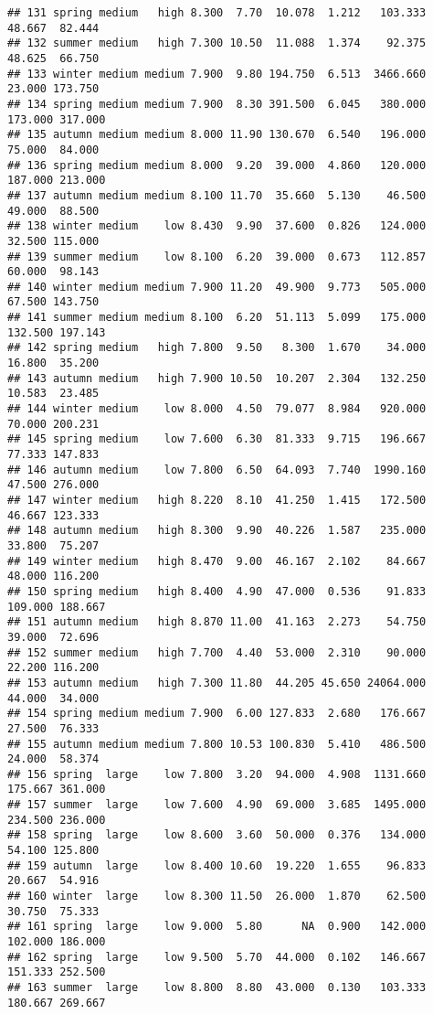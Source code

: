 \documentclass[
]{article}
\begin{document}
\begin{verbatim}
## 131 spring medium   high 8.300  7.70  10.078  1.212   103.333  48.667  82.444
## 132 summer medium   high 7.300 10.50  11.088  1.374    92.375  48.625  66.750
## 133 winter medium medium 7.900  9.80 194.750  6.513  3466.660  23.000 173.750
## 134 spring medium medium 7.900  8.30 391.500  6.045   380.000 173.000 317.000
## 135 autumn medium medium 8.000 11.90 130.670  6.540   196.000  75.000  84.000
## 136 spring medium medium 8.000  9.20  39.000  4.860   120.000 187.000 213.000
## 137 autumn medium medium 8.100 11.70  35.660  5.130    46.500  49.000  88.500
## 138 winter medium    low 8.430  9.90  37.600  0.826   124.000  32.500 115.000
## 139 summer medium    low 8.100  6.20  39.000  0.673   112.857  60.000  98.143
## 140 winter medium medium 7.900 11.20  49.900  9.773   505.000  67.500 143.750
## 141 summer medium medium 8.100  6.20  51.113  5.099   175.000 132.500 197.143
## 142 spring medium   high 7.800  9.50   8.300  1.670    34.000  16.800  35.200
## 143 autumn medium   high 7.900 10.50  10.207  2.304   132.250  10.583  23.485
## 144 winter medium    low 8.000  4.50  79.077  8.984   920.000  70.000 200.231
## 145 spring medium    low 7.600  6.30  81.333  9.715   196.667  77.333 147.833
## 146 autumn medium    low 7.800  6.50  64.093  7.740  1990.160  47.500 276.000
## 147 winter medium   high 8.220  8.10  41.250  1.415   172.500  46.667 123.333
## 148 autumn medium   high 8.300  9.90  40.226  1.587   235.000  33.800  75.207
## 149 winter medium   high 8.470  9.00  46.167  2.102    84.667  48.000 116.200
## 150 spring medium   high 8.400  4.90  47.000  0.536    91.833 109.000 188.667
## 151 autumn medium   high 8.870 11.00  41.163  2.273    54.750  39.000  72.696
## 152 summer medium   high 7.700  4.40  53.000  2.310    90.000  22.200 116.200
## 153 autumn medium   high 7.300 11.80  44.205 45.650 24064.000  44.000  34.000
## 154 spring medium medium 7.900  6.00 127.833  2.680   176.667  27.500  76.333
## 155 autumn medium medium 7.800 10.53 100.830  5.410   486.500  24.000  58.374
## 156 spring  large    low 7.800  3.20  94.000  4.908  1131.660 175.667 361.000
## 157 summer  large    low 7.600  4.90  69.000  3.685  1495.000 234.500 236.000
## 158 spring  large    low 8.600  3.60  50.000  0.376   134.000  54.100 125.800
## 159 autumn  large    low 8.400 10.60  19.220  1.655    96.833  20.667  54.916
## 160 winter  large    low 8.300 11.50  26.000  1.870    62.500  30.750  75.333
## 161 spring  large    low 9.000  5.80      NA  0.900   142.000 102.000 186.000
## 162 spring  large    low 9.500  5.70  44.000  0.102   146.667 151.333 252.500
## 163 summer  large    low 8.800  8.80  43.000  0.130   103.333 180.667 269.667

\end{verbatim}
\end{document}
